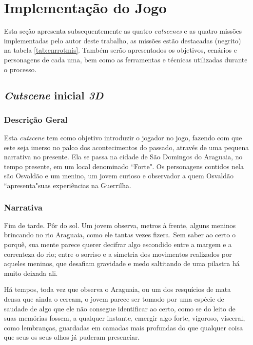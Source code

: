 \section{Implementação do Jogo}
\label{sec:implementacao}

Esta seção apresenta subsequentemente as quatro \textit{cutscenes} e as quatro missões implementadas pelo autor deste trabalho, as missões estão destacadas (negrito) na tabela \ref{tab:enrrotmis}. Também serão apresentados os objetivos, cenários e personagens de cada uma, bem como as ferramentas e técnicas utilizadas durante o processo.

\subsection{\textit{Cutscene} inicial \textit{3D}}
\label{subsec:cutscene3D}

\subsubsection{Descrição Geral}

Esta \textit{cutscene} tem como objetivo introduzir o jogador no jogo, fazendo com que este seja imerso no palco dos acontecimentos do passado, através de uma pequena narrativa no presente. Ela se passa na cidade de São Domingos do Araguaia, no tempo presente, em um local denominado ``Forte". Os personagens contidos nela são Osvaldão e um menino, um jovem curioso e observador a quem Osvaldão ``apresenta"\space suas experiências na Guerrilha.

\subsubsection{Narrativa}

Fim de tarde. Pôr do sol. Um jovem observa, metros à frente, alguns meninos brincando no rio Araguaia, como ele tantas vezes fizera. Sem saber ao certo o porquê, sua mente parece querer decifrar algo escondido entre a margem e a correnteza do rio; entre o sorriso e a simetria dos movimentos realizados por aqueles meninos, que desafiam gravidade e medo saltitando de uma pilastra há muito deixada ali.

Há tempos, toda vez que observa o Araguaia, ou um dos resquícios de mata densa que ainda o cercam, o jovem parece ser tomado por uma espécie de saudade de algo que ele não consegue identificar ao certo, como se do leito de suas memórias fossem, a qualquer instante, emergir algo forte, vigoroso, visceral, como lembranças, guardadas em camadas mais profundas do que qualquer coisa que seus os seus olhos já puderam presenciar.

